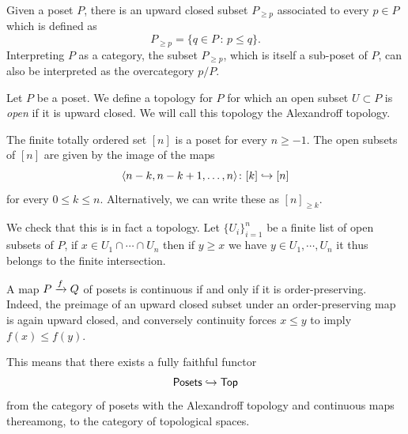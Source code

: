 \begin{observation}
Given a poset $P$, there is an upward closed subset $P_{\geq p}$ associated to every $p \in P$ which is defined as 
\begin{equation}
    P_{\geq p} = \{ q \in P\,:\, p \leq q \}.
\end{equation}
Interpreting $P$ as a category, the subset $P_{\geq p}$, which is itself a sub-poset of $P$, can also be interpreted as the overcategory $p/P$.  
\end{observation}

\begin{definition}\label{ch4:: def: strat_topology}
    Let $P$ be a poset. We define a topology for $P$ for which an open subset $U \subset P$ is \emph{open} if it is upward closed. We will call this topology the Alexandroff topology. 
\end{definition}

\begin{example}
    The finite totally ordered set $[n]$ is a poset for every $n\geq -1$. The open subsets of $[n]$ are given by the image of the maps 
    \begin{equation}
    \langle n-k, n-k +1, \ldots, n \rangle \colon [k] \hookrightarrow [n]
    \end{equation} for every $0\leq k\leq n$. Alternatively, we can write these as $[n]_{\geq k}$.
\end{example}

\begin{observation}
We check that this is in fact a topology. Let $\{U_{i}\}_{i=1}^{n}$ be a finite list of open subsets of $P$, if $x \in U_1 \cap \cdots \cap U_n$ then if $y\geq x$ we have $y\in U_1,\cdots, U_n$ it thus belongs to the finite intersection.       
\end{observation}

A map $P \xrightarrow{f} Q$ of posets is continuous if and only if it is order-preserving. Indeed, the preimage of an upward closed subset under an order-preserving map is again upward closed, and conversely continuity forces $x\leq y$ to imply $f(x)\leq f(y)$. 

\begin{observation}\label{ch4: obs:: posets as tops}
    This means that there exists a fully faithful functor 
    \begin{equation}
        \mathsf{Posets} \hookrightarrow \operatorname{\mathsf{Top}}
    \end{equation}
    from the category of posets with the Alexandroff topology and continuous maps thereamong, to the category of topological spaces.
\end{observation}

